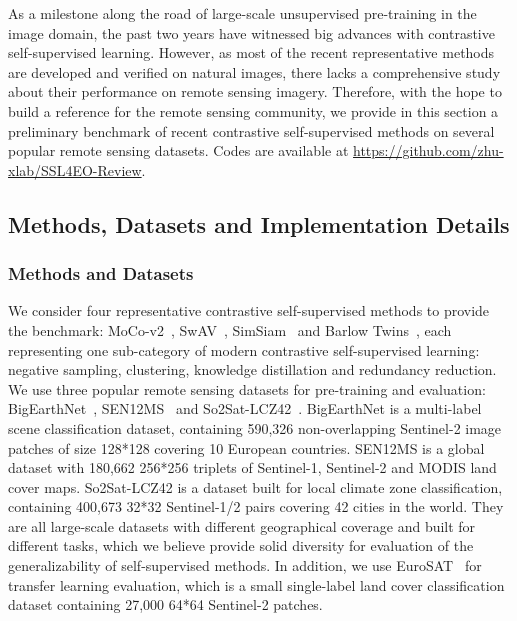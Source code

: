 \documentclass[lettersize,journal]{IEEEtran}
\begin{document}
\label{sec:benchmark-ssl-rs}


As a milestone along the road of large-scale unsupervised pre-training in the image domain, the past two years have witnessed big advances with contrastive self-supervised learning. However, as most of the recent representative methods are developed and verified on natural images, there lacks a comprehensive study about their performance on remote sensing imagery. Therefore, with the hope to build a reference for the remote sensing community, we provide in this section a preliminary benchmark of recent contrastive self-supervised methods on several popular remote sensing datasets. Codes are available at \url{https://github.com/zhu-xlab/SSL4EO-Review}.



\subsection{Methods, Datasets and Implementation Details}


\subsubsection{Methods and Datasets} We consider four representative contrastive self-supervised methods to provide the benchmark: MoCo-v2~\cite{chen2020improved}, SwAV~\cite{caron2020unsupervised}, SimSiam~\cite{chen2021exploring} and Barlow Twins~\cite{zbontar2021barlow}, each representing one sub-category of modern contrastive self-supervised learning: negative sampling, clustering, knowledge distillation and redundancy reduction. We use three popular remote sensing datasets for pre-training and evaluation: BigEarthNet~\cite{sumbul2019bigearthnet}, SEN12MS~\cite{schmitt2019sen12ms} and So2Sat-LCZ42~\cite{zhu2019so2sat}. BigEarthNet is a multi-label scene classification dataset, containing 590,326 non-overlapping Sentinel-2 image patches of size 128*128 covering 10 European countries. SEN12MS is a global dataset with 180,662 256*256 triplets of Sentinel-1, Sentinel-2 and MODIS land cover maps. So2Sat-LCZ42 is a dataset built for local climate zone classification, containing 400,673 32*32 Sentinel-1/2 pairs covering 42 cities in the world. They are all large-scale datasets with different geographical coverage and built for different tasks, which we believe provide solid diversity for evaluation of the generalizability of self-supervised methods. In addition, we use EuroSAT~\cite{helber2019eurosat} for transfer learning evaluation, which is a small single-label land cover classification dataset containing 27,000 64*64 Sentinel-2 patches.
\end{document}
